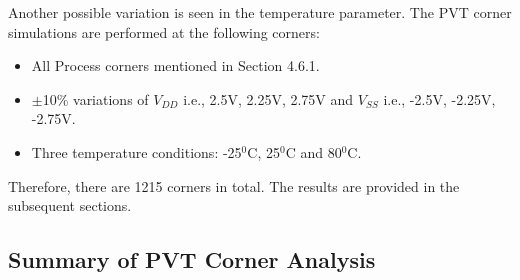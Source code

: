 Another possible variation is seen in the temperature parameter. The PVT corner simulations are performed at the following corners:
\begin{itemize}
\item All Process corners mentioned in Section 4.6.1.
\item $\pm$10\% variations of $V_{DD}$ i.e., 2.5V, 2.25V, 2.75V and $V_{SS}$ i.e., -2.5V, -2.25V, -2.75V.
\item Three temperature conditions: -25$^0$C, 25$^0$C and 80$^0$C.
\end{itemize}

Therefore, there are 1215 corners in total. The results are provided in the subsequent sections.

\subsection{Summary of PVT Corner Analysis}